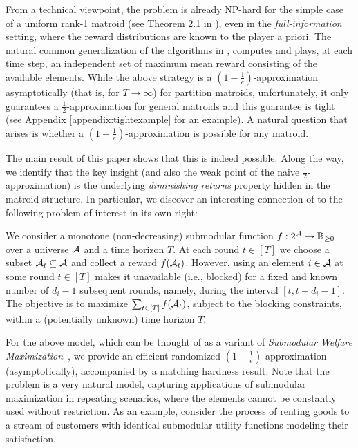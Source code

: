 From a technical viewpoint, the \mbb problem is already NP-hard for the simple case of a uniform rank-1 matroid (see Theorem 2.1 in \cite{SST09}), even in the {\em full-information} setting, where the reward distributions are known to the player a priori. The natural common generalization of the algorithms in \cite{BSSS19,KWAEE14}, computes and plays, at each time step, an independent set of maximum mean reward consisting of the available elements. While the above strategy is a $\left(1-\frac{1}{e}\right)$-approximation asymptotically (that is, for $T \to \infty$) for partition matroids, unfortunately, it only guarantees a $\frac{1}{2}$-approximation for general matroids and this guarantee is tight (see Appendix \ref{appendix:tightexample} for an example). A natural question that arises is whether a $\left(1-\frac{1}{e}\right)$-approximation is possible for any matroid. 

The main result of this paper shows that this is indeed possible. Along the way, we identify that the key insight (and also the weak point of the naive $\frac{1}{2}$-approximation) is the underlying {\em diminishing returns} property hidden in the matroid structure. In particular, we discover an interesting connection of \mbb to the following problem of interest in its own right:

\begin{problem}
We consider a monotone (non-decreasing) submodular function $f:2^{\operatorname{\mathcal{A}}} \rightarrow \mathbb{R}_{\geq 0}$ over a universe $\operatorname{\mathcal{A}}$ and a time horizon $T$. At each round $t \in [T]$ we choose a subset $\operatorname{\mathcal{A}}_t \subseteq \operatorname{\mathcal{A}}$ and collect a reward $f(\operatorname{\mathcal{A}}_t)$. However, using an element $i \in \operatorname{\mathcal{A}}$ at some round $t \in [T]$ makes it unavailable (i.e., blocked) for a fixed and known number of $d_i-1$ subsequent rounds, namely, during the interval $[t, t + d_i -1]$. The objective is to maximize $\sum_{t \in [T]} f(\operatorname{\mathcal{A}}_t)$, subject to the blocking constraints, within a (potentially unknown) time horizon $T$.
\end{problem}

For the above model, which can be thought of as a variant of {\em Submodular Welfare Maximization}~\cite{Von08}, we provide an efficient randomized $\left(1 - \frac{1}{e}\right)$-approximation (asymptotically), accompanied by a matching hardness result. Note that the \rsm problem is a very natural model, capturing applications of submodular maximization in repeating scenarios, where the elements cannot be constantly used without restriction. As an example, consider the process of renting goods to a stream of customers with identical submodular utility functions modeling their satisfaction.

